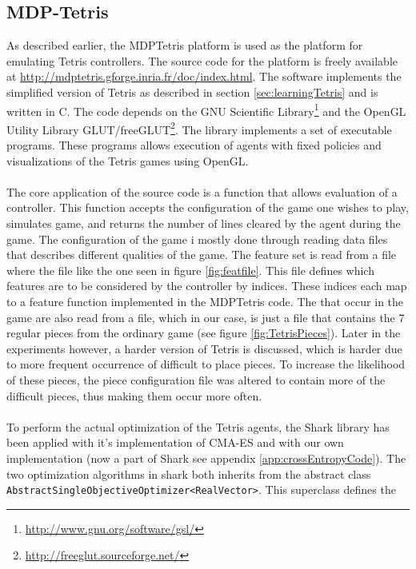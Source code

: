 \subsection{MDP-Tetris \label{sec:MDPTetris}}

As described earlier, the MDPTetris platform is used as the 
platform for emulating Tetris controllers. The source code for the 
platform is freely available at \url{http://mdptetris.gforge.inria.fr/doc/index.html}.
The software implements the simplified version of Tetris as described in 
section \ref{sec:learningTetris} and is written in C. The code depends on
the GNU Scientific Library\footnote{\url{http://www.gnu.org/software/gsl/}} and
the OpenGL Utility 
Library GLUT/freeGLUT\footnote{\url{http://freeglut.sourceforge.net/}}.
The library implements a set of executable programs. These programs 
allows execution of agents with fixed policies and visualizations
of the Tetris games using OpenGL.\\
\\
The core application of the source code is a function that allows evaluation of 
a controller. This function accepts the configuration of the game one wishes to play,
simulates game, and returns the number of lines cleared by the agent during the game.
The configuration of the game i mostly done through reading data files that describes 
different qualities of the game. The feature set is read from a file where the file
like the one seen in figure \ref{fig:featfile}. This file defines which features are to be 
considered by the controller by indices. These indices each map to a feature function 
implemented in the MDPTetris code. The that occur in the game are also read from a file,
which in our case, is just a file that contains the 7 regular pieces from the ordinary game
(see figure \ref{fig:TetrisPieces}). Later in the experiments however, a harder version of Tetris
is discussed, which is harder due to more frequent occurrence of difficult to place pieces.
To increase the likelihood of these pieces, the piece configuration file was altered to
contain more of the difficult pieces, thus making them occur more often.\\
\\
To perform the actual optimization of the Tetris agents, the Shark library has been applied
with it's implementation of CMA-ES and with our own implementation (now a part of Shark
see appendix \ref{app:crossEntropyCode}). The two optimization algorithms in shark both 
inherits from the abstract class 
\lstinline$AbstractSingleObjectiveOptimizer<RealVector>$. This superclass defines the
